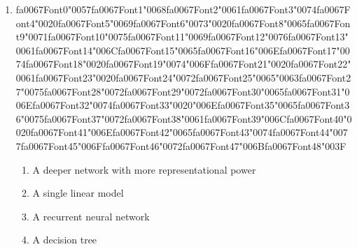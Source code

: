 \documentclass[12pt]{article}
\begin{document}
\begin{enumerate}[label=Q\arabic*.]
\begin{enumerate}[label=(\Alph*)]
    \item They increase in value as the sequence progresses
    \item Only the output weight V is reused
\end{enumerate}
\item {\csname fa0067Font0\endcsname\char"0057}{\csname fa0067Font1\endcsname\char"0068}{\csname fa0067Font2\endcsname\char"0061}{\csname fa0067Font3\endcsname\char"0074}{\csname fa0067Font4\endcsname\char"0020}{\csname fa0067Font5\endcsname\char"0069}{\csname fa0067Font6\endcsname\char"0073}{\char"0020}{\csname fa0067Font8\endcsname\char"0065}{\csname fa0067Font9\endcsname\char"0071}{\csname fa0067Font10\endcsname\char"0075}{\csname fa0067Font11\endcsname\char"0069}{\csname fa0067Font12\endcsname\char"0076}{\csname fa0067Font13\endcsname\char"0061}{\csname fa0067Font14\endcsname\char"006C}{\csname fa0067Font15\endcsname\char"0065}{\csname fa0067Font16\endcsname\char"006E}{\csname fa0067Font17\endcsname\char"0074}{\csname fa0067Font18\endcsname\char"0020}{\csname fa0067Font19\endcsname\char"0074}{\char"006F}{\csname fa0067Font21\endcsname\char"0020}{\csname fa0067Font22\endcsname\char"0061}{\csname fa0067Font23\endcsname\char"0020}{\csname fa0067Font24\endcsname\char"0072}{\csname fa0067Font25\endcsname\char"0065}{\char"0063}{\csname fa0067Font27\endcsname\char"0075}{\csname fa0067Font28\endcsname\char"0072}{\csname fa0067Font29\endcsname\char"0072}{\csname fa0067Font30\endcsname\char"0065}{\csname fa0067Font31\endcsname\char"006E}{\csname fa0067Font32\endcsname\char"0074}{\csname fa0067Font33\endcsname\char"0020}{\char"006E}{\csname fa0067Font35\endcsname\char"0065}{\csname fa0067Font36\endcsname\char"0075}{\csname fa0067Font37\endcsname\char"0072}{\csname fa0067Font38\endcsname\char"0061}{\csname fa0067Font39\endcsname\char"006C}{\csname fa0067Font40\endcsname\char"0020}{\csname fa0067Font41\endcsname\char"006E}{\csname fa0067Font42\endcsname\char"0065}{\csname fa0067Font43\endcsname\char"0074}{\csname fa0067Font44\endcsname\char"0077}{\csname fa0067Font45\endcsname\char"006F}{\csname fa0067Font46\endcsname\char"0072}{\csname fa0067Font47\endcsname\char"006B}{\csname fa0067Font48\endcsname\char"003F}
\begin{enumerate}[label=(\Alph*)]
    \item A deeper network with more representational power
    \item A single linear model
    \item A recurrent neural network
    \item A decision tree

\end{enumerate}
\end{enumerate}
\end{document}
